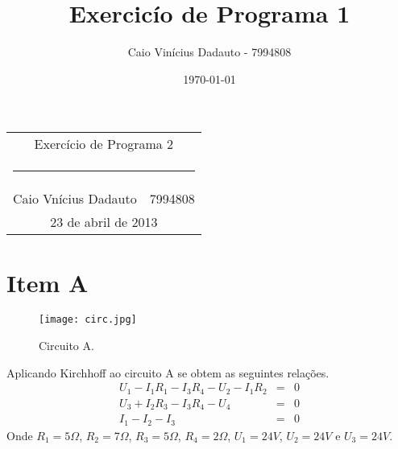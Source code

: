 \documentclass[a4paper,11pt, twoside]{article}
\date{\today}
\author{Caio Vinícius Dadauto - 7994808}
\title{Exercicío de Programa 1}
\begin{document}
    \pagestyle{fancy}
    \fancyhf{}
    \renewcommand{\footrulewidth}{0.1pt}
    \renewcommand{\headrulewidth}{0.0pt}
    \fancyfoot[LE, RO]{\bfseries \thepage}

    \begin{center}
        \begin{tabular}{c}
            {\huge Exercício de Programa 2}\\[-0.5cm]
            \rule{0.6\textwidth}{0.1mm}\\
            Caio Vnícius Dadauto$\quad$7994808\\
            {\small 23 de abril de 2013}
        \end{tabular}
    \end{center}
    \vspace{2cm}

    \section*{Item A}
    \begin{figure}[!ht]
        \begin{center}
            \texttt{[image: circ.jpg]}
        \end{center}
        \caption{Circuito A.\label{A}}
    \end{figure}

    Aplicando Kirchhoff ao circuito A se obtem as seguintes relações.
    \begin{eqnarray}
        U_1 - I_1R_1 - I_3R_4 - U_2 - I_1R_2 & = & 0\\
        U_3 + I_2R_3 - I_3R_4 - U_4 & = & 0\\
        I_1 - I_2 - I_3 & = & 0
    \end{eqnarray}
    Onde $R_1 = 5\Omega$, $R_2 = 7\Omega$, $R_3 = 5\Omega$, $R_4 = 2\Omega$,
    $U_1 = 24V$, $U_2 = 24V$ e $U_3 = 24V$.
\end{document}
